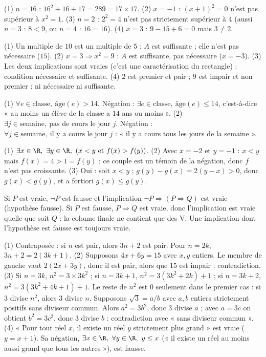 \begin{solution}
(1) $n=16$ : $16^2+16+17=289=17\times17$. (2) $x=-1$ : $(x+1)^2=0$ n'est pas supérieur à $x^2=1$. (3) $n=2$ : $2^2=4$ n'est pas strictement supérieur à $4$ (aussi $n=3$ : $8<9$, ou $n=4$ : $16=16$). (4) $x=3$ : $9-15+6=0$ mais $3\ne2$.
\end{solution}
\begin{solution}
(1) Un multiple de $10$ est un multiple de $5$ : $A$ est suffisante ; elle n'est pas nécessaire ($15$). (2) $x=3\Rightarrow x^2=9$ : $A$ est suffisante, pas nécessaire ($x=-3$). (3) Les deux implications sont vraies (c'est une caractérisation du rectangle) : condition nécessaire et suffisante. (4) $2$ est premier et pair ; $9$ est impair et non premier : ni nécessaire ni suffisante.
\end{solution}
\begin{solution}
(1) $\forall e\in\text{classe},\ \text{âge}(e)>14$. Négation : $\exists e\in\text{classe},\ \text{âge}(e)\le14$, c'est-à-dire « au moins un élève de la classe a $14$ ans ou moins ». (2) $\exists j\in\text{semaine},\ \text{pas de cours le jour }j$. Négation : $\forall j\in\text{semaine},\ \text{il y a cours le jour }j$ : « il y a cours tous les jours de la semaine ».
\end{solution}
\begin{solution}
(1) $\exists x\in\R,\ \exists y\in\R,\ (x<y\text{ et }f(x)>f(y))$. (2) Avec $x=-2$ et $y=-1$ : $x<y$ mais $f(x)=4>1=f(y)$ ; ce couple est un témoin de la négation, donc $f$ n'est pas croissante. (3) Oui : soit $x<y$ ; $g(y)-g(x)=2(y-x)>0$, donc $g(x)<g(y)$, et a fortiori $g(x)\le g(y)$.
\end{solution}
\begin{solution}
Si $P$ est vraie, $\lnot P$ est fausse et l'implication $\lnot P\Rightarrow(P\Rightarrow Q)$ est vraie (hypothèse fausse). Si $P$ est fausse, $P\Rightarrow Q$ est vraie, donc l'implication est vraie quelle que soit $Q$ : la colonne finale ne contient que des V. Une implication dont l'hypothèse est fausse est toujours vraie.
\end{solution}
\begin{solution}
(1) Contraposée : si $n$ est pair, alors $3n+2$ est pair. Pour $n=2k$, $3n+2=2(3k+1)$. (2) Supposons $4x+6y=15$ avec $x,y$ entiers. Le membre de gauche vaut $2(2x+3y)$, donc il est pair, alors que $15$ est impair : contradiction. (3) Si $n=3k$, $n^2=3\times3k^2$ ; si $n=3k+1$, $n^2=3(3k^2+2k)+1$ ; si $n=3k+2$, $n^2=3(3k^2+4k+1)+1$. Le reste de $n^2$ est $0$ seulement dans le premier cas : si $3$ divise $n^2$, alors $3$ divise $n$. Supposons $\sqrt3=a/b$ avec $a,b$ entiers strictement positifs sans diviseur commun. Alors $a^2=3b^2$, donc $3$ divise $a$ ; avec $a=3c$ on obtient $b^2=3c^2$, donc $3$ divise $b$ : contradiction avec « sans diviseur commun ». (4) « Pour tout réel $x$, il existe un réel $y$ strictement plus grand » est vraie ($y=x+1$). Sa négation, $\exists x\in\R,\ \forall y\in\R,\ y\le x$ (« il existe un réel au moins aussi grand que tous les autres »), est fausse.
\end{solution}
